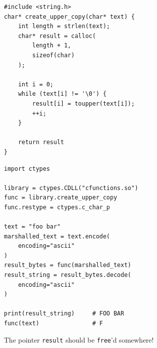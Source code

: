 \begin{frame}[fragile]
%
\begin{tcbraster}[raster columns=2,
                  raster equal height,
                  nobeforeafter,
                  raster column skip=0.2cm]
\begin{codebox}
\begin{verbatim}
#include <string.h>
char* create_upper_copy(char* text) {
    int length = strlen(text);
    char* result = calloc(
        length + 1,
        sizeof(char)
    );
    
    int i = 0;
    while (text[i] != '\0') {
        result[i] = toupper(text[i]);
        ++i;
    }
    
    return result
}
\end{verbatim}
\end{codebox}
%
\begin{codebox}
\begin{verbatim}
import ctypes

library = ctypes.CDLL("cfunctions.so")
func = library.create_upper_copy
func.restype = ctypes.c_char_p

text = "foo bar"
marshalled_text = text.encode(
    encoding="ascii"
)
result_bytes = func(marshalled_text)
result_string = result_bytes.decode(
    encoding="ascii"
)

print(result_string)     # FOO BAR
func(text)               # F
\end{verbatim}
\end{codebox}
\end{tcbraster}
%
\begin{warnbox}[]
\footnotesize
The pointer \texttt{result} should be \texttt{free}'d somewhere!
\end{warnbox}
%
\end{frame}


